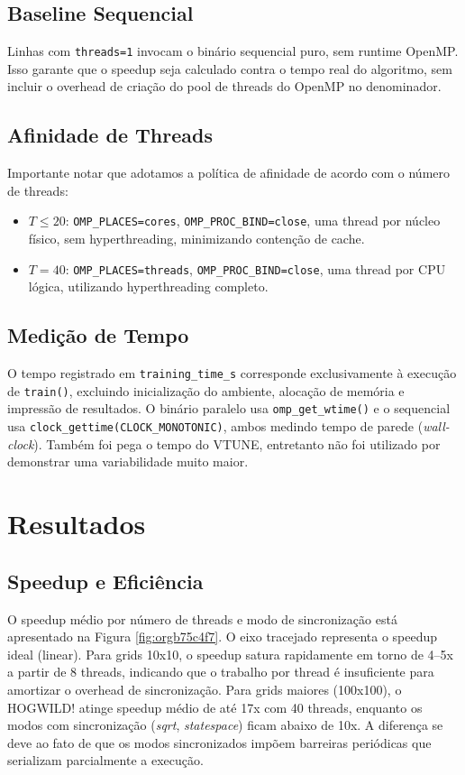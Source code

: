 \documentclass[12pt]{article}
\begin{document}
\subsection{Baseline Sequencial}
\label{sec:org9168f76}

Linhas com \texttt{threads=1} invocam o binário sequencial puro, sem runtime
OpenMP. Isso garante que o speedup seja calculado contra o tempo real
do algoritmo, sem incluir o overhead de criação do pool de threads do
OpenMP no denominador.
\subsection{Afinidade de Threads}
\label{sec:orgd70a030}

Importante notar que adotamos a política de afinidade de acordo com o número de threads:

\begin{itemize}
\item \(T \leq 20\): \texttt{OMP\_PLACES=cores}, \texttt{OMP\_PROC\_BIND=close}, uma thread
por núcleo físico, sem hyperthreading, minimizando contenção de cache.
\item \(T = 40\): \texttt{OMP\_PLACES=threads}, \texttt{OMP\_PROC\_BIND=close}, uma thread
por CPU lógica, utilizando hyperthreading completo.
\end{itemize}
\subsection{Medição de Tempo}
\label{sec:org1b36bdc}

O tempo registrado em \texttt{training\_time\_s} corresponde exclusivamente à
execução de \texttt{train()}, excluindo inicialização do ambiente, alocação de
memória e impressão de resultados. O binário paralelo usa
\texttt{omp\_get\_wtime()} e o sequencial usa \texttt{clock\_gettime(CLOCK\_MONOTONIC)},
ambos medindo tempo de parede (\emph{wall-clock}). Também foi pega o tempo do
VTUNE, entretanto não foi utilizado por demonstrar uma variabilidade
muito maior.
\section{Resultados}
\label{sec:org3e8794b}
\subsection{Speedup e Eficiência}
\label{sec:org3234da1}

O speedup médio por número de threads e modo de sincronização está
apresentado na Figura \ref{fig:orgb75c4f7}. O eixo tracejado representa
o speedup ideal (linear). Para grids 10x10, o speedup satura rapidamente
em torno de 4--5x a partir de 8 threads, indicando que o trabalho por
thread é insuficiente para amortizar o overhead de sincronização. Para
grids maiores (100x100), o HOGWILD! atinge speedup médio de até 17x com
40 threads, enquanto os modos com sincronização (\textit{sqrt},
\textit{statespace}) ficam abaixo de 10x. A diferença se deve ao fato de
que os modos sincronizados impõem barreiras periódicas que serializam
parcialmente a execução.
\end{document}
